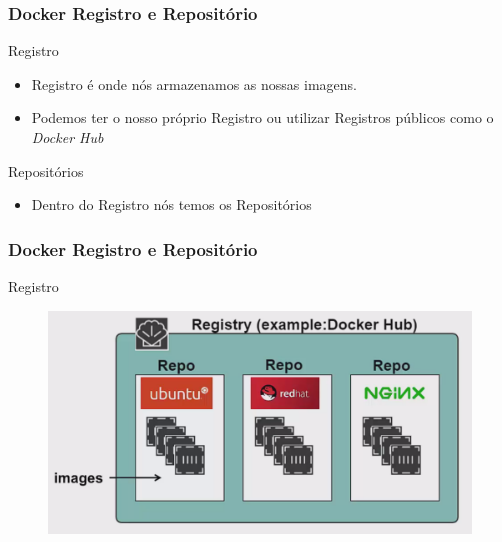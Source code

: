 \documentclass[12pt]{beamer}
\begin{document}
\begin{frame}
  \frametitle{Docker Registro e Repositório}
	\begin{block}{Registro}
		\begin{itemize}
			\pause
			\item Registro é onde nós armazenamos as nossas imagens.
			\pause
			\item Podemos ter o nosso próprio Registro ou utilizar Registros públicos
							como o \emph{Docker Hub}
		\end{itemize}
	\end{block}
	\begin{block}{Repositórios}
		\begin{itemize}
			\pause
			\item Dentro do Registro nós temos os Repositórios
		\end{itemize}
	\end{block}
\end{frame}
\begin{frame}
  \frametitle{Docker Registro e Repositório}
	\begin{block}{Registro}
		\begin{figure}[!h]
			\centering
			\includegraphics[width=0.6\paperwidth]{registrorepo}
		\end{figure}
	\end{block}
\end{frame}
\end{document}
